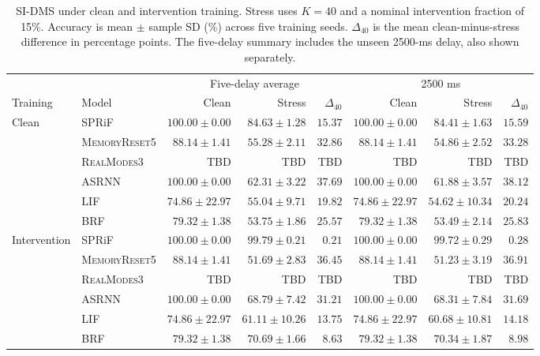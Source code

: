 \documentclass[letterpaper,journal]{IEEEtran}
\newcommand{\mr}{\textnormal{\textsc{MemoryReset5}}}
\newcommand{\rmodes}{\textnormal{\textsc{RealModes3}}}
\begin{document}
\begin{table}[t]
\caption{SI-DMS under clean and intervention training. Stress uses $K=40$ and a nominal intervention fraction of 15\%. Accuracy is mean $\pm$ sample SD (\%) across five training seeds. $\Delta_{40}$ is the mean clean-minus-stress difference in percentage points. The five-delay summary includes the unseen 2500-ms delay, also shown separately.}
\label{tab:sidms_results}
\centering\footnotesize\setlength{\tabcolsep}{4pt}
\begin{tabular}{@{}llrrrrrr@{}}
\toprule
& & \multicolumn{3}{c}{Five-delay average} & \multicolumn{3}{c}{2500 ms}\\
\cmidrule(lr){3-5}\cmidrule(l){6-8}
Training & Model & Clean & Stress & $\Delta_{40}$ & Clean & Stress & $\Delta_{40}$\\
\midrule
Clean & SPRiF & $100.00\pm0.00$ & $84.63\pm1.28$ & $15.37$ & $100.00\pm0.00$ & $84.41\pm1.63$ & $15.59$\\
 & \mr & $88.14\pm1.41$ & $55.28\pm2.11$ & $32.86$ & $88.14\pm1.41$ & $54.86\pm2.52$ & $33.28$\\
 & \rmodes & TBD & TBD & TBD & TBD & TBD & TBD \\
 & ASRNN & $100.00\pm0.00$ & $62.31\pm3.22$ & $37.69$ & $100.00\pm0.00$ & $61.88\pm3.57$ & $38.12$\\
 & LIF & $74.86\pm22.97$ & $55.04\pm9.71$ & $19.82$ & $74.86\pm22.97$ & $54.62\pm10.34$ & $20.24$\\
 & BRF & $79.32\pm1.38$ & $53.75\pm1.86$ & $25.57$ & $79.32\pm1.38$ & $53.49\pm2.14$ & $25.83$\\
\midrule
Intervention & SPRiF & $100.00\pm0.00$ & $99.79\pm0.21$ & $0.21$ & $100.00\pm0.00$ & $99.72\pm0.29$ & $0.28$\\
 & \mr & $88.14\pm1.41$ & $51.69\pm2.83$ & $36.45$ & $88.14\pm1.41$ & $51.23\pm3.19$ & $36.91$\\
 & \rmodes & TBD & TBD & TBD & TBD & TBD & TBD \\
 & ASRNN & $100.00\pm0.00$ & $68.79\pm7.42$ & $31.21$ & $100.00\pm0.00$ & $68.31\pm7.84$ & $31.69$\\
 & LIF & $74.86\pm22.97$ & $61.11\pm10.26$ & $13.75$ & $74.86\pm22.97$ & $60.68\pm10.81$ & $14.18$\\
 & BRF & $79.32\pm1.38$ & $70.69\pm1.66$ & $8.63$ & $79.32\pm1.38$ & $70.34\pm1.87$ & $8.98$\\
\bottomrule
\end{tabular}
\end{table}
\end{document}
